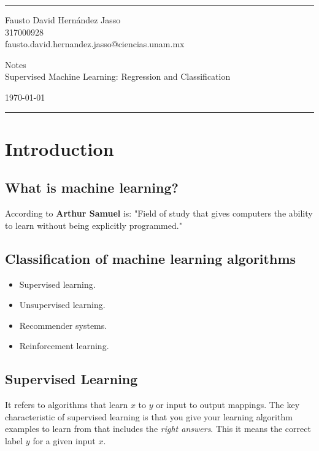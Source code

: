 \documentclass[a4paper]{article}
\begin{document}

\fancyhead[C]{}
\hrule \medskip %
\begin{minipage}{0.295\textwidth} 
\raggedright
\footnotesize
Fausto David Hernández Jasso \hfill\\   
317000928 \hfill\\
fausto.david.hernandez.jasso@ciencias.unam.mx
\end{minipage}
\begin{minipage}{0.4\textwidth} 
\centering 
\large 
Notes\\ 
\normalsize 
Supervised Machine Learning: Regression and Classification\\ 
\end{minipage}
\begin{minipage}{0.295\textwidth} 
\raggedleft
\today\hfill\\
\end{minipage}
\medskip\hrule 
\bigskip
\section{Introduction}
\subsection{What is machine learning?}
\noindent
According to \textbf{Arthur Samuel} is: "Field of study that gives computers
the ability to learn without being explicitly programmed."
\subsection{Classification of machine learning algorithms}
\noindent
\begin{itemize}
    \item Supervised learning.
    \item Unsupervised learning.
    \item Recommender systems.
    \item Reinforcement learning.
\end{itemize}
\subsection{Supervised Learning}
\noindent
It refers to algorithms that learn \(x\) to \(y\) or input to output mappings.
The key characteristic of supervised learning is that you give your learning 
algorithm examples to learn from that includes the \textit{right answers}.
This it means the correct label \(y\) for a given input \(x\).
\end{document}

